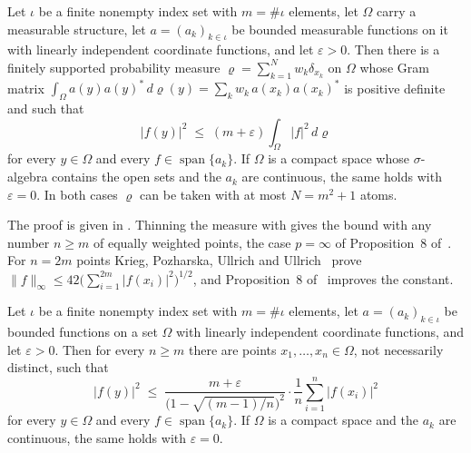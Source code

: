 \begin{theorem}
\label{thm:optimal-design}
\leanok
Let $\iota$ be a finite nonempty index set with $m = \#\iota$ elements, let $\Omega$ carry
a measurable structure, let $a = (a_k)_{k \in \iota}$ be bounded measurable functions on it
with linearly independent coordinate functions, and let $\varepsilon > 0$. Then there is a
finitely supported probability measure $\varrho = \sum_{k=1}^N w_k \delta_{x_k}$ on
$\Omega$ whose Gram matrix $\int_\Omega a(y) a(y)^* \, d\varrho(y)
= \sum_k w_k \, a(x_k) a(x_k)^*$ is positive definite and such that
\[
  |f(y)|^2 \; \leq \; (m + \varepsilon) \int_\Omega |f|^2 \, d\varrho
\]
for every $y \in \Omega$ and every $f \in \operatorname{span}\{a_k\}$. If $\Omega$ is a
compact space whose $\sigma$-algebra contains the open sets and the $a_k$ are continuous,
the same holds with $\varepsilon = 0$. In both cases $\varrho$ can be taken with at most
$N = m^2 + 1$ atoms.
\end{theorem}

The proof is given in . Thinning the measure with
 gives the bound with any number $n \geq m$ of equally
weighted points, the case $p = \infty$ of Proposition~8 of~\cite{CDKU}. For $n = 2m$ points
Krieg, Pozharska, Ullrich and Ullrich~\cite[Theorem~2]{KPUU} prove
$\|f\|_\infty \leq 42 \bigl( \sum_{i=1}^{2m} |f(x_i)|^2 \bigr)^{1/2}$, and Proposition~8
of~\cite{CDKU} improves the constant.

\begin{theorem}
\label{thm:uniform-discretization}
\leanok
Let $\iota$ be a finite nonempty index set with $m = \#\iota$ elements, let
$a = (a_k)_{k \in \iota}$ be bounded functions on a set $\Omega$ with linearly independent
coordinate functions, and let $\varepsilon > 0$. Then for every $n \geq m$ there are points
$x_1, \dots, x_n \in \Omega$, not necessarily distinct, such that
\[
  |f(y)|^2 \; \leq \; \frac{m + \varepsilon}{\bigl( 1 - \sqrt{(m-1)/n} \bigr)^2}
    \cdot \frac{1}{n} \sum_{i=1}^n |f(x_i)|^2
\]
for every $y \in \Omega$ and every $f \in \operatorname{span}\{a_k\}$. If $\Omega$ is a
compact space and the $a_k$ are continuous, the same holds with $\varepsilon = 0$.
\end{theorem}

